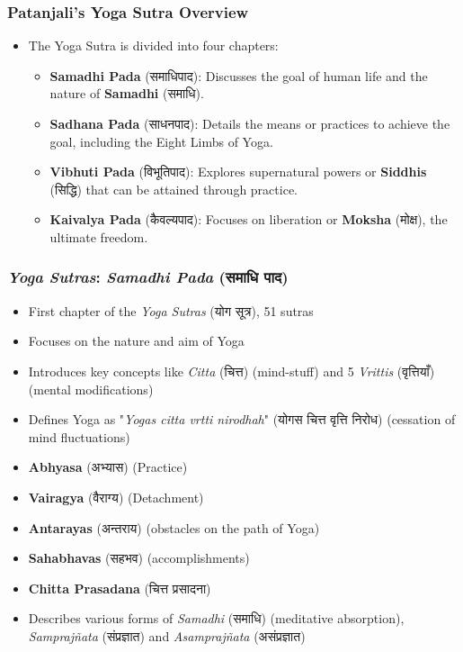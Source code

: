 \begin{frame}[fragile]\frametitle{Patanjali's Yoga Sutra Overview}
    \begin{itemize}
        \item The Yoga Sutra is divided into four chapters:
        \begin{itemize}
            \item \textbf{Samadhi Pada} (समाधिपाद): Discusses the goal of human life and the nature of \textbf{Samadhi} (समाधि).
            \item \textbf{Sadhana Pada} (साधनपाद): Details the means or practices to achieve the goal, including the Eight Limbs of Yoga.
            \item \textbf{Vibhuti Pada} (विभूतिपाद): Explores supernatural powers or \textbf{Siddhis} (सिद्धि) that can be attained through practice.
            \item \textbf{Kaivalya Pada} (कैवल्यपाद): Focuses on liberation or \textbf{Moksha} (मोक्ष), the ultimate freedom.
        \end{itemize}
    \end{itemize}
\end{frame}


\begin{frame}[fragile]\frametitle{\textit{Yoga Sutras}: \textit{Samadhi Pada} (समाधि पाद)}

    \begin{itemize}
        \item First chapter of the \textit{Yoga Sutras} (योग सूत्र), 51 sutras
        \item Focuses on the nature and aim of Yoga
        \item Introduces key concepts like \textit{Citta} (चित्त) (mind-stuff) and 5 \textit{Vrittis} (वृत्तियाँ) (mental modifications)
        \item Defines Yoga as "\textit{Yogas citta vrtti nirodhah}" (योगस चित्त वृत्ति निरोध) (cessation of mind fluctuations)
        \item \textbf{Abhyasa} (अभ्यास) (Practice)
        \item \textbf{Vairagya} (वैराग्य) (Detachment)
        \item \textbf{Antarayas} (अन्तराय) (obstacles on the path of Yoga)
        \item \textbf{Sahabhavas} (सहभव) (accomplishments)
        \item \textbf{Chitta Prasadana} (चित्त प्रसादना)
        \item Describes various forms of \textit{Samadhi} (समाधि) (meditative absorption), \textit{Samprajñata} (संप्रज्ञात) and \textit{Asamprajñata} (असंप्रज्ञात)
    \end{itemize}

\end{frame}



